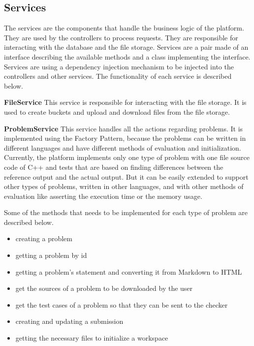 \documentclass[12pt,a4paper]{report}
\begin{document}
\newpage
\subsection{Services}
The services are the components that handle the business logic of the platform. They are used by the controllers to process requests. They are responsible for interacting with the database and the file storage. Services are a pair made of an interface describing the available methods and a class implementing the interface. Services are using a dependency injection mechanism to be injected into the controllers and other services. The functionality of each service is described below.

\textbf{FileService}
This service is responsible for interacting with the file storage. It is used to create buckets\protect\footnotemark{} and upload and download files from the file storage.

\textbf{ProblemService}
This service handles all the actions regarding problems. It is implemented using the Factory Pattern, because the problems can be written in different languages and have different methods of evaluation and initialization. Currently, the platform implements only one type of problem with one file source code of C++ and tests that are based on finding differences between the reference output and the actual output. But it can be easily extended to support other types of problems, written in other languages, and with other methods of evaluation like asserting the execution time or the memory usage.

Some of the methods that needs to be implemented for each type of problem are described below.

\begin{itemize}
	\item creating a problem
	\item getting a problem by id
	\item getting a problem's statement and converting it from Markdown to HTML
	\item get the sources of a problem to be downloaded by the user
	\item get the test cases of a problem so that they can be sent to the checker
	\item creating and updating a submission
	\item getting the necessary files to initialize a workspace
\end{itemize}
\end{document}
